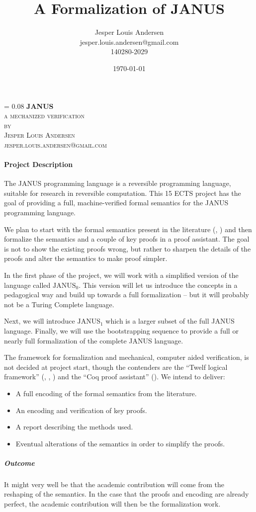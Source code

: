 \documentclass[a4paper, oneside, 10pt]{memoir}
\author{Jesper Louis
  Andersen\\jesper.louis.andersen@gmail.com\\140280-2029}
\title{A Formalization of JANUS}
\date{\today}
\makeatletter
\renewcommand*{\titleM}{\begingroup%
  \drop = 0.08\textheight
  \centering
  {\Huge\bfseries JANUS}\\[\baselineskip]
  {\scshape a mechanized verification}\\[\baselineskip]
  {\scshape by}\\[\baselineskip]
  {\large\scshape Jesper Louis Andersen\\jesper.louis.andersen@gmail.com}\par
  \endgroup}
\makeatother
\begin{document}
\titleM

\paragraph{Project Description}

The JANUS programming language is a reversible programming language,
suitable for research in reversible computation. This 15 ECTS project
has the goal of providing a full, machine-verified formal semantics
for the JANUS programming language.

We plan to start with the formal semantics present in the literature
(\cite{glueck2007}, \cite{glueck2008}) and then formalize the
semantics and a couple of key proofs in a proof assistant. The goal is
not to show the existing proofs wrong, but rather to sharpen the
details of the proofs and alter the semantics to make proof simpler.

In the first phase of the project, we will work with a simplified
version of the language called $\mathrm{JANUS}_0$. This version will
let us introduce the concepts in a pedagogical way and build up
towards a full formalization -- but it will probably not be a Turing
Complete language.

Next, we will introduce $\mathrm{JANUS_1}$ which is a larger subset of
the full JANUS language. Finally, we will use the bootstrapping
sequence to provide a full or nearly full formalization of the
complete JANUS language.

The framework for formalization and mechanical, computer aided
verification, is not decided at project start, though the contenders
are the ``Twelf logical framework'' (\cite{harper+07:mechanizing},
\cite{hhp93lf}, \cite{twelf}) and the ``Coq proof assistant'' (\cite{coqdev}).
We intend to deliver:
\begin{itemize}
\item A full encoding of the formal semantics from the literature.
\item An encoding and verification of key proofs.
\item A report describing the methods used.
\item Eventual alterations of the semantics in order to simplify the
  proofs.
\end{itemize}

\subparagraph{Outcome}
\label{sec:consequence}

It might very well be that the academic contribution will come from
the reshaping of the semantics. In the case that the proofs and
encoding are already perfect, the academic contribution will then be
the formalization work.
\end{document}
